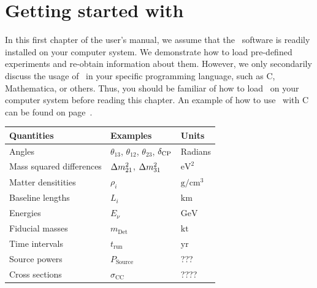 \chapter{Getting started with \GLOBES }

In this first chapter of the user's manual, we assume that the \GLOBES\ software is readily installed on your computer system. We demonstrate how to load pre-defined experiments and re-obtain information about them. However, we only secondarily discuss the usage of \GLOBES\ in your specific programming language, such as C, Mathematica, or others. Thus, you should be familiar of how to load \GLOBES\ on your computer system before reading this chapter. An example of how to use \GLOBES\ with C can be found on page~\pageref{ex:c}. 


\begin{table}[t]
\begin{center}
\begin{tabular}{lll}
\hline
Quantities & Examples & Units \\
\hline
Angles & $\theta_{13}$, $\theta_{12}$, $\theta_{23}$, $\delta_{\mathrm{CP}}$ & Radians  \\
Mass squared differences & $\Delta m_{21}^2$, $\Delta m_{31}^2$ & $\mathrm{eV}^2$ \\
Matter densitities & $\rho_i$ & $\mathrm{g}/\mathrm{cm}^3$ \\
Baseline lengths & $L_i$ & $\mathrm{km}$ \\
Energies & $E_\nu$ & $\mathrm{GeV}$ \\  
Fiducial masses & $m_{\mathrm{Det}}$ & $\mathrm{kt}$ \\
Time intervals & $t_{\mathrm{run}}$ & $\mathrm{yr}$ \\
Source powers & $P_{\mathrm{Source}}$ & ??? \\
Cross sections & $\sigma_{\mathrm{CC}}$ &  ???? \\
\hline
\end{tabular}
\end{center}
\end{table}

